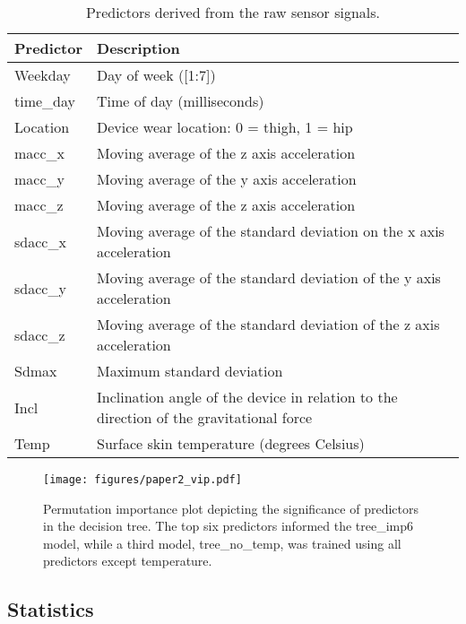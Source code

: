 \documentclass[
  10pt,
]{scrbook}
\begin{document}
\begingroup

\footnotesize

\hypertarget{tbl-8}{}
\begin{longtable}{ll}
\caption{\label{tbl-8}Predictors derived from the raw sensor signals. }\tabularnewline

\toprule
Predictor & Description \\ 
\midrule
Weekday & Day of week ([1:7]) \\ 
time\_day & Time of day (milliseconds) \\ 
Location & Device wear location: 0 = thigh, 1 = hip \\ 
macc\_x & Moving average of the z axis acceleration \\ 
macc\_y & Moving average of the y axis acceleration \\ 
macc\_z & Moving average of the z axis acceleration \\ 
sdacc\_x & Moving average of the standard deviation on the x axis acceleration \\ 
sdacc\_y & Moving average of the standard deviation of the y axis acceleration \\ 
sdacc\_z & Moving average of the standard deviation of the z axis acceleration \\ 
Sdmax & Maximum standard deviation \\ 
Incl & Inclination angle of the device in relation to the direction of the gravitational force \\ 
Temp & Surface skin temperature (degrees Celsius) \\ 
\bottomrule
\end{longtable}

\endgroup

\begin{figure}

{\centering \texttt{[image: figures/paper2\_vip.pdf]}

}

\caption{\label{fig-importance}Permutation importance plot depicting the
significance of predictors in the decision tree. The top six predictors
informed the tree\_imp6 model, while a third model, tree\_no\_temp, was
trained using all predictors except temperature.}

\end{figure}

\hypertarget{statistics-1}{%
\subsection{Statistics}\label{statistics-1}}
\end{document}

